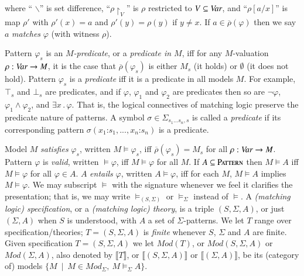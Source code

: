 \documentclass[UTF8,11pt]{article}
\theoremstyle{plain}
\theoremstyle{definition}
\theoremstyle{remark}
\newcommand{\cln}{\texttt{:}}
\newcommand{\Mod}{\textit{Mod}}
\newcommand{\denote}[1]{\llbracket{#1}\rrbracket}
\newcommand{\Pattern}{\textsc{Pattern}\xspace}
\begin{document}
where `` $\backslash$'' is set difference,
``$\rho\!\!\upharpoonright_V$'' is
$\rho$ restricted to $V \subseteq \textit{Var}$,
and ``$\rho[a/x]$'' is map $\rho'$ with $\rho'(x)=a$ and $\rho'(y)=\rho(y)$ if
$y\neq x$.
If $a\in \overline{\rho}(\varphi)$ then we say $a$ \emph{matches}
$\varphi$ (with witness $\rho$).

Pattern $\varphi_s$ is an \emph{$M$-predicate}, or a
\emph{predicate in $M$}, iff for any $M$-valuation $\rho:\textit{Var}\rightarrow M$,
it is the case that $\overline{\rho}(\varphi_s)$ is either $M_s$ (it holds) or
$\emptyset$ (it does not hold).
Pattern $\varphi_s$ is a \emph{predicate} iff it is a predicate in all
models $M$.
For example, $\top_s$ and $\bot_s$ are predicates, and if $\varphi$,
$\varphi_1$ and $\varphi_2$ are predicates then so are $\neg\varphi$,
$\varphi_1 \wedge \varphi_2$, and $\exists x\,.\,\varphi$.
That is, the logical connectives of matching logic preserve the predicate
nature of patterns.
A symbol $\sigma\in\Sigma_{s_1 \ldots s_n,s}$ is called a \emph{predicate} if
its corresponding pattern $\sigma(x_1\cln s_1,...,x_n\cln s_n)$ is a
predicate.

Model $M$ \emph{satisfies} $\varphi_s$, written ${M}\models \varphi_s$, iff
$\overline{\rho}(\varphi_s) = M_s$ for all $\rho:\textit{Var}\rightarrow M$.
Pattern $\varphi$ is \emph{valid}, written $\models \varphi$,
iff ${M} \models \varphi$ for all ${M}$.
If $A\subseteq\Pattern$ then ${M} \models A$ iff
${M} \models \varphi$ for all $\varphi\in A$.
$A$ \emph{entails} $\varphi$, written $A \models \varphi$,
iff for each ${M}$, ${M} \models A$ implies ${M} \models \varphi$.
We may subscript $\models$ with the signature whenever we feel it
clarifies the presentation; that is, we may write $\models_{(S,\Sigma)}$ or
$\models_\Sigma$ instead of $\models$.
A \emph{(matching logic) specification}, or a \emph{(matching logic) theory},
is a triple $(S,\Sigma,A)$, or just $(\Sigma,A)$ when $S$ is understood,
with $A$ a set of $\Sigma$-patterns.
We let $T$ range over specification/theories;
$T = (S,\Sigma,A)$ is \emph{finite} whenever $S$, $\Sigma$ and $A$ are finite.
Given specification $T=(S,\Sigma,A)$ we let $\Mod(T)$, or
$\Mod(S,\Sigma,A)$ or $\Mod(\Sigma,A)$, also denoted by $\denote{T}$,
or $\denote{(S,\Sigma,A)}$ or $\denote{(\Sigma,A)}$, be its (category of)
models $\{M \ \mid \ M \in \Mod_{\Sigma},\ M \models_{\Sigma} A \}$.
\end{document}
